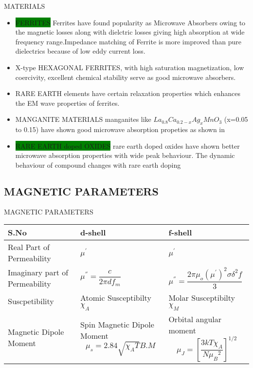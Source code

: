 \documentclass[11pt,aspect ratio=169]{beamer}
\begin{document}
\begin{frame}[t]{MATERIALS}
	\begin{itemize}
		\item \colorbox{green}{FERRITES} Ferrites have found popularity as Microwave Absorbers owing to the magnetic losses along with dielctric losses giving high absorption at wide frequency range.Impedance matching of Ferrite is more improved than pure dielectrics because of low eddy current loss\cite{r18}.
		\item X-type HEXAGONAL FERRITES, with high saturation magnetization, low coercivity, excellent chemical stability serve as good microwave absorbers.
		\item RARE EARTH elements have certain relaxation properties which enhances the EM wave properties of ferrites\cite{r16}.
		\item MANGANITE MATERIALS manganites like $La_{0.8}Ca_{0.2-x}Ag_x Mn O_3$ (x=0.05 to 0.15) have shown good microwave absorption propeties as shown in \cite{r17,r18}
		\item \colorbox{green}{RARE EARTH doped OXIDES} rare earth doped oxides have shown better microwave absorption properties with wide peak behaviour. The dynamic behaviour of compound changes with rare earth doping \cite{r19}
	\end{itemize}
	\end{frame}
\subsection{MAGNETIC PARAMETERS}
\begin{frame}[t]{MAGNETIC PARAMETERS}
\begin{tabular}{p{}p{}p{}}
	S.No & d-shell & f-shell\\
	\hline
Real Part of Permeability & $\mu^{'}$ & $\mu^{'}$\\
	\hline
Imaginary part of Permeability & $\mu^{''} = \dfrac{c}{2 \pi d f_m}$ & $\mu^{''} = \dfrac{2 \pi \mu_o {(\mu^{'})}^2 \sigma \delta^{2} f}{3}$\\
	\hline
Suscpetibility & Atomic Susceptibilty $\chi_A$ & Molar Susceptibilty $\chi_M$
	
	\\
	\hline
	
Magnetic Dipole Moment & Spin Magnetic Dipole Moment $$\mu_s = 2.84 \sqrt{\chi_A T} B.M$$ & Orbital angular moment$$\mu_{J} = {[\dfrac{3kT\chi_A}{N {\mu_B}^2}]}^{1/2}$$
	\\
\end{tabular}

	\end{frame}
\end{document}
